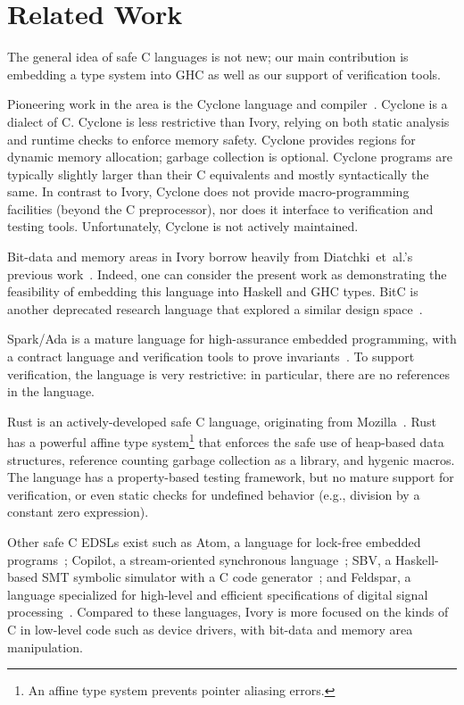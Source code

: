 \section{Related Work}
\label{sec:related-work}

The general idea of safe C languages is not new; our main contribution is
embedding a type system into GHC as well as our support of verification
tools.

Pioneering work in the area is the Cyclone language and
compiler~\cite{cyclone}. Cyclone is a dialect of C. Cyclone is less restrictive than
Ivory, relying on both static analysis and runtime checks to enforce memory
safety. Cyclone provides regions for dynamic memory allocation; garbage
collection is optional. Cyclone programs are typically slightly larger than
their C equivalents and mostly syntactically the same. In contrast to Ivory,
Cyclone does not provide macro-programming facilities (beyond the C
preprocessor), nor does it interface to verification and testing
tools. Unfortunately, Cyclone is not actively maintained.

Bit-data and memory areas in Ivory borrow heavily from Diatchki~et~al.'s
previous work~\cite{high-level, memareas}. Indeed, one can consider the present
work as demonstrating the feasibility of embedding this language into Haskell
and GHC types. BitC is another deprecated research language that explored a
similar design space~\cite{bitc}.

Spark/Ada is a mature language for high-assurance embedded
programming, with a contract language and verification tools to
prove invariants~\cite{spark}. To support verification, the language is
very restrictive: in particular, there are no references in the language.

Rust is an actively-developed safe C language, originating from
Mozilla~\cite{rust}. Rust has a powerful affine type system\footnote{An affine
type system prevents pointer aliasing errors.} that enforces the safe use of
heap-based data structures, reference counting garbage collection as a library,
and hygenic macros. The language has a property-based testing framework, but no
mature support for verification, or even static checks for undefined behavior
(e.g., division by a constant zero expression).

Other safe C EDSLs exist such as Atom, a language for
lock-free embedded programs~\cite{atom}; Copilot, a stream-oriented synchronous
language~\cite{copilot}; SBV, a Haskell-based SMT symbolic simulator with a C code
generator~\cite{sbv}; and Feldspar, a language specialized for high-level and
efficient specifications of digital signal processing~\cite{feldspar1}. Compared to these
languages, Ivory is more focused on the kinds of C in low-level code such as
device drivers, with bit-data and memory area manipulation.
